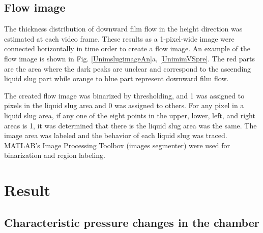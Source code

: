 \documentclass[aps,pre,preprint,groupedaddress,showkeys]{revtex4-2}
\begin{document}
\subsection{Flow image}\label{flowim}
The thickness distribution of downward film flow in the height direction was estimated at each video frame.
These results as a 1-pixel-wide image were connected horizontally in time order to create a flow image.
An example of the flow image is shown in Fig. \ref{UnimslugimageAn}a, \ref{UnimimVSpre}. 
The red parts are the area where the dark peaks are unclear and correspond to the ascending liquid slug part while orange to blue part represent downward film flow.

The created flow image was binarized by thresholding, and 1 was assigned to pixels in the liquid slug area and 0 was assigned to others.
For any pixel in a liquid slug area, if any one of the eight points in the upper, lower, left, and right areas is 1, it was determined that there is the liquid slug area was the same. 
The image area was labeled and the behavior of each liquid slug was traced.
MATLAB's Image Processing Toolbox (images segmenter) were used for binarization and region labeling.


\section{Result}\label{res}
\subsection{Characteristic pressure changes in the chamber}
\end{document}
